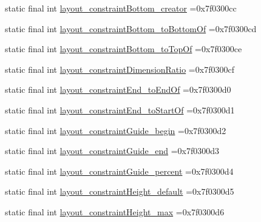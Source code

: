 \begin{DoxyCompactItemize}
\item 
static final int \mbox{\hyperlink{classbr_1_1unb_1_1cic_1_1mp_1_1marketmaster_1_1test_1_1R_1_1attr_ae2deb4287b6247f76caebd98a1d6a971}{layout\+\_\+constraint\+Bottom\+\_\+creator}} =0x7f0300cc
\item 
static final int \mbox{\hyperlink{classbr_1_1unb_1_1cic_1_1mp_1_1marketmaster_1_1test_1_1R_1_1attr_ad20854d696e0a0879b0a72848026862b}{layout\+\_\+constraint\+Bottom\+\_\+to\+Bottom\+Of}} =0x7f0300cd
\item 
static final int \mbox{\hyperlink{classbr_1_1unb_1_1cic_1_1mp_1_1marketmaster_1_1test_1_1R_1_1attr_a8edd08d3544f67d24a3f5ac0bb46535a}{layout\+\_\+constraint\+Bottom\+\_\+to\+Top\+Of}} =0x7f0300ce
\item 
static final int \mbox{\hyperlink{classbr_1_1unb_1_1cic_1_1mp_1_1marketmaster_1_1test_1_1R_1_1attr_ac4baefc6f703f8499d16f22e5bab13c9}{layout\+\_\+constraint\+Dimension\+Ratio}} =0x7f0300cf
\item 
static final int \mbox{\hyperlink{classbr_1_1unb_1_1cic_1_1mp_1_1marketmaster_1_1test_1_1R_1_1attr_a0576180ab933dd450e8adf509ed28aa1}{layout\+\_\+constraint\+End\+\_\+to\+End\+Of}} =0x7f0300d0
\item 
static final int \mbox{\hyperlink{classbr_1_1unb_1_1cic_1_1mp_1_1marketmaster_1_1test_1_1R_1_1attr_ac34952e050cd526b83d88a601a828767}{layout\+\_\+constraint\+End\+\_\+to\+Start\+Of}} =0x7f0300d1
\item 
static final int \mbox{\hyperlink{classbr_1_1unb_1_1cic_1_1mp_1_1marketmaster_1_1test_1_1R_1_1attr_a7e275e9f067bf9606cbb50790b7951e7}{layout\+\_\+constraint\+Guide\+\_\+begin}} =0x7f0300d2
\item 
static final int \mbox{\hyperlink{classbr_1_1unb_1_1cic_1_1mp_1_1marketmaster_1_1test_1_1R_1_1attr_a721cd6f47de1b5101db015a9145b38e4}{layout\+\_\+constraint\+Guide\+\_\+end}} =0x7f0300d3
\item 
static final int \mbox{\hyperlink{classbr_1_1unb_1_1cic_1_1mp_1_1marketmaster_1_1test_1_1R_1_1attr_ad51fc4f46f5ea99b8e9b3c46e7b1f182}{layout\+\_\+constraint\+Guide\+\_\+percent}} =0x7f0300d4
\item 
static final int \mbox{\hyperlink{classbr_1_1unb_1_1cic_1_1mp_1_1marketmaster_1_1test_1_1R_1_1attr_ab60a724537add5a1d5f663667ccfbead}{layout\+\_\+constraint\+Height\+\_\+default}} =0x7f0300d5
\item 
static final int \mbox{\hyperlink{classbr_1_1unb_1_1cic_1_1mp_1_1marketmaster_1_1test_1_1R_1_1attr_adb7e71f963bf10a3db724f5fe3979f22}{layout\+\_\+constraint\+Height\+\_\+max}} =0x7f0300d6

\end{DoxyCompactItemize}
